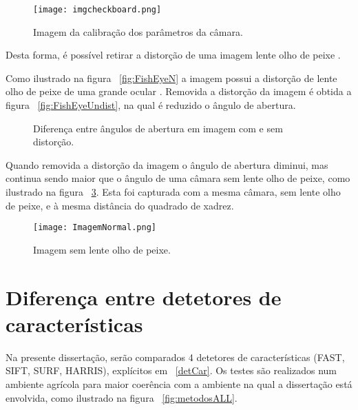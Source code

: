 \begin{figure}[h!]  %
	\centering
	\texttt{[image: imgcheckboard.png]} 
	\caption{Imagem da calibração dos parâmetros da câmara.}
	\label{fig:imgcheckboard}  %
\end{figure}


Desta forma, é possível retirar a distorção de uma imagem lente olho de peixe . 



Como ilustrado na figura ~\ref{fig:FishEyeN} a imagem possui a distorção de lente olho de peixe  de uma grande ocular .  Removida a distorção da imagem é obtida a figura ~\ref{fig:FishEyeUndist}, na qual é reduzido o ângulo de abertura.

\begin{figure}[h!]
	\centering
	\qquad
	\caption{Diferença entre ângulos de abertura em imagem com e sem distorção.}\label{fig:FisheEye}
\end{figure}


Quando removida a distorção da imagem o ângulo de abertura diminui, mas continua sendo maior que o ângulo de uma câmara sem lente olho de peixe, como ilustrado na figura ~\ref{fig:ImageNorm}. Esta foi capturada com a mesma câmara, sem lente olho de peixe, e à mesma distância do quadrado de xadrez.

\begin{figure}[h!]
	\centering
	\texttt{[image: ImagemNormal.png]}
	\caption{Imagem sem lente olho de peixe.}
	\label{fig:ImageNorm}
\end{figure}







\section{Diferença entre detetores de características}

Na presente dissertação, serão comparados 4 detetores de características (FAST, SIFT, SURF, HARRIS), explícitos em  ~\ref{detCar}. Os testes são realizados num ambiente agrícola para maior coerência com a ambiente na qual a dissertação está envolvida, como ilustrado na figura ~\ref{fig:metodosALL}.



